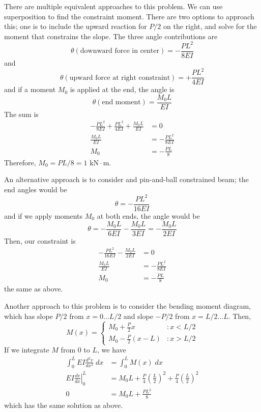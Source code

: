 \begin{solution}
There are multiple equivalent approaches to this problem. We can use superposition to find the constraint moment. There are two options to approach this; one is to include the upward reaction for $P/2$ on the right, and solve for the moment that constrains the slope. The three angle contributions are
\[
\theta(\text{downward force in center}) = -\frac{PL^2}{8EI}
\]
and
\[
\theta(\text{upward force at right constraint}) = +\frac{PL^2}{4EI}
\]
and if a moment $M_0$ is applied at the end, the angle is
\[
\theta(\text{end moment}) = \frac{M_0L}{EI}
\]
The sum is
\[
\begin{split}
-\frac{PL^2}{8EI} + \frac{PL^2}{4EI} + \frac{M_0L}{EI} &= 0\\
\frac{M_0L}{EI} &= -\frac{PL^2}{8EI}\\
M_0 &= -\frac{PL}{8}
\end{split}
\]
Therefore, $M_0 = PL/8 = 1\text{ kN}\cdot\text{m}$.

An alternative approach is to consider and pin-and-ball constrained beam; the end angles would be
\[
\theta = -\frac{PL^2}{16EI}
\]
and if we apply moments $M_0$ at both ends, the angle would be
\[
\theta = -\frac{M_0L}{6EI} - \frac{M_0L}{3EI} = -\frac{M_0L}{2EI}
\]
Then, our constraint is
\[
\begin{split}
-\frac{PL^2}{16EI} - \frac{M_0L}{2EI} &= 0\\
\frac{M_0L}{EI} &= -\frac{PL^2}{8EI}\\
M_0 &= -\frac{PL}{8}
\end{split}
\]
the same as above.

Another approach to this problem is to consider the bending moment diagram, which has slope $P/2$ from $x=0\ldots L/2$ and slope $-P/2$ from $x=L/2\ldots L$. Then,
\[
M(x)=
\begin{cases}
M_0 +\frac{P}{2}x &: x<L/2\\
M_0 -\frac{P}{2}(x-L) &: x>L/2
\end{cases}
\]
If we integrate $M$ from 0 to $L$, we have
\[
\begin{split}
\int_0^L EI\frac{d^2v}{dx^2}\; dx &= \int_0^L M(x)\;dx\\
EI\left.\frac{dv}{dx}\right|_0^L &= M_0 L +\frac{P}{4}\left(\frac{L}{2}\right)^2 +\frac{P}{4}\left(\frac{L}{2}\right)^2\\
0 &= M_0L + \frac{PL^2}{8}
\end{split}
\]
which has the same solution as above.
\end{solution}

